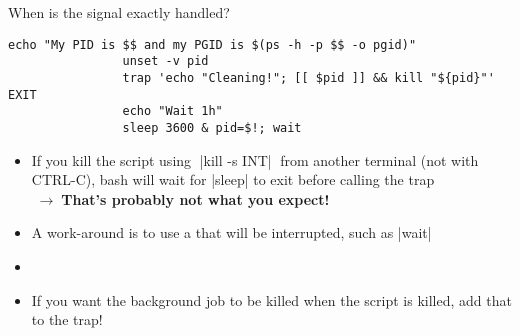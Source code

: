 \begin{frame}[fragile]{When is the signal exactly handled?}
\begin{overlayarea}{\textwidth}{0.28\textheight}
\begin{onlyenv}
\begin{lstlisting}[style=MyBash, firstnumber=12]
                echo "My PID is $$ and my PGID is $(ps -h -p $$ -o pgid)"
                unset -v pid
                trap 'echo "Cleaning!"; [[ $pid ]] && kill "${pid}"' EXIT
                echo "Wait 1h"
                sleep 3600 & pid=$!; wait
            \end{lstlisting}
        \end{onlyenv}
    \end{overlayarea}
    \vspace{-1.5mm}
    \begin{itemize}
        \item If you kill the script using $\;$\bash|kill -s INT|$\;$ from another terminal (not with CTRL-C), bash will wait for \bash|sleep| to exit before calling the trap\\
              $\;\to\;$\alert{\textbf{That's probably not what you expect!}}
        \item<2-> A work-around is to use a  that will be interrupted, such as \bash|wait|
        \item<2-> 
        \item<3-> If you want the background job to be killed when the script is killed, add that to the trap!
    \end{itemize}
\end{frame}
